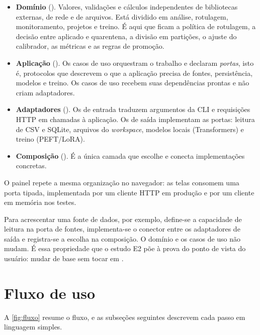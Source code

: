 \begin{itemize}
  \item \textbf{Domínio} (). Valores, validações e cálculos independentes de bibliotecas externas, de rede e de arquivos. Está dividido em análise, rotulagem, monitoramento, projetos e treino. É aqui que ficam a política de rotulagem, a decisão entre aplicado e quarentena, a divisão em partições, o ajuste do calibrador, as métricas e as regras de promoção.
  \item \textbf{Aplicação} (). Os casos de uso orquestram o trabalho e declaram \emph{portas}, isto é, protocolos que descrevem o que a aplicação precisa de fontes, persistência, modelos e treino. Os casos de uso recebem suas dependências prontas e não criam adaptadores.
  \item \textbf{Adaptadores} (). Os de entrada traduzem argumentos da CLI e requisições HTTP em chamadas à aplicação. Os de saída implementam as portas: leitura de CSV e SQLite, arquivos do \emph{workspace}, modelos locais (Transformers) e treino (PEFT/LoRA).
  \item \textbf{Composição} (). É a única camada que escolhe e conecta implementações concretas.
\end{itemize}

O painel repete a mesma organização no navegador: as telas consomem uma porta tipada, implementada por um cliente HTTP em produção e por um cliente em memória nos testes.

Para acrescentar uma fonte de dados, por exemplo, define-se a capacidade de leitura na porta de fontes, implementa-se o conector entre os adaptadores de saída e registra-se a escolha na composição. O domínio e os casos de uso não mudam. É essa propriedade que o estudo E2 põe à prova do ponto de vista do usuário: mudar de base sem tocar em .

\section{Fluxo de uso}
\label{sec:fluxo}

A \autoref{fig:fluxo} resume o fluxo, e as subseções seguintes descrevem cada passo em linguagem simples.

